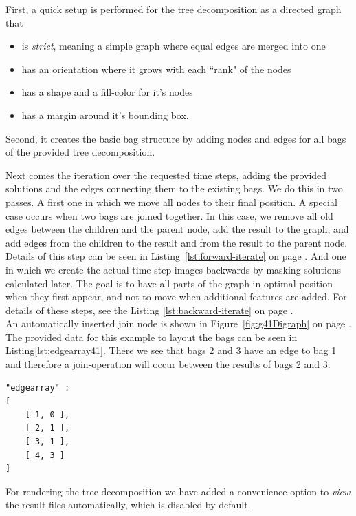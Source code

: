 \documentclass[a4paper, 12pt, bibliography=totoc]{scrartcl}
\begin{document}
First, a quick setup is performed for the tree decomposition as a directed graph that 
\begin{itemize}
	\item is \textit{strict}, meaning a simple graph where equal edges are merged into one
	\item has an orientation where it grows with each ``rank" of the nodes
	\item has a shape and a fill-color for it's nodes
	\item has a margin around it's bounding box.
\end{itemize}

Second, it creates the basic bag structure by adding nodes and edges for all bags of the provided tree decomposition.

Next comes the iteration over the requested time steps, adding the provided solutions and the edges connecting them to the existing bags. We do this in two passes.  A first one in which we move all nodes to their final position. A special case occurs when two bags are joined together.
In this case, we remove all old edges between the children and the parent node, add the result to the graph, and add edges from the children to the result and from the result to the parent node. Details of this step can be seen in Listing~\ref{lst:forward-iterate} on page \pageref{lst:forward-iterate}. And one in which we create the actual time step images backwards by masking solutions calculated later. The goal is to have all parts of the graph in optimal position when they first appear, and not to move when additional features are added. For details of these steps, see the Listing \ref{lst:backward-iterate} on page \pageref{lst:backward-iterate}.\\

An automatically inserted join node is shown in Figure~\ref{fig:g41Digraph} on page \pageref{fig:g41Digraph}.
The provided data for this example to layout the bags can be seen in Listing\ref{lst:edgearray41}. There we see that bags 2 and 3 have an edge to bag 1 and therefore a join-operation will occur between the results of bags 2 and 3:

\begin{lstlisting}[caption={Structure provided for bags of example \ref{fig:g41Digraph} },label={lst:edgearray41},numbers=none,backgroundcolor=\color{white}]
"edgearray" : 
[
	[ 1, 0 ],
	[ 2, 1 ],
	[ 3, 1 ],
	[ 4, 3 ]
]
\end{lstlisting}

For rendering the tree decomposition we have added a convenience option to \textit{view} the result files automatically, which is disabled by default.
\end{document}

